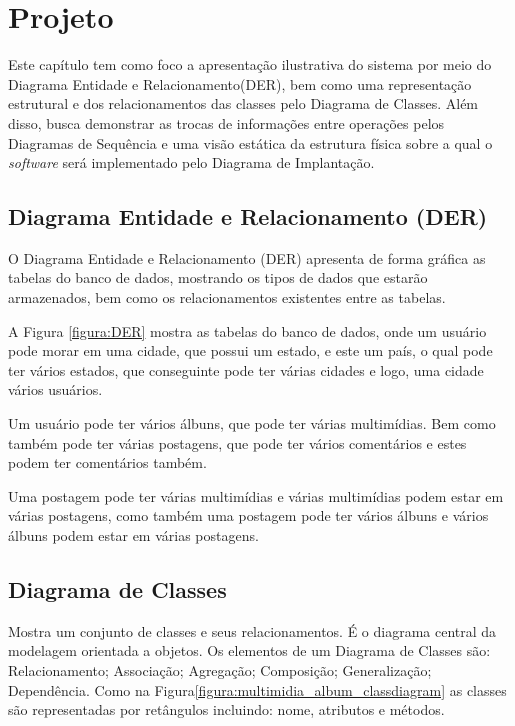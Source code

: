 \chapter{Projeto}

Este capítulo tem como foco a apresentação ilustrativa do sistema por meio do Diagrama Entidade e Relacionamento(DER), bem como uma representação estrutural e dos relacionamentos das classes pelo Diagrama de Classes. Além disso, busca demonstrar as trocas de informações entre operações pelos Diagramas de Sequência e uma visão estática da estrutura física sobre a qual o \textit{software} será implementado pelo Diagrama de Implantação.

\section{Diagrama Entidade e Relacionamento (DER)}

O Diagrama Entidade e Relacionamento (DER) apresenta de forma gráfica as tabelas do banco de dados, mostrando os tipos de dados que estarão armazenados, bem como os relacionamentos existentes entre as tabelas.

A Figura \ref{figura:DER} mostra as tabelas do banco de dados, onde um usuário pode morar em uma cidade, que possui um estado, e este um país, o qual pode ter vários estados, que conseguinte pode ter várias cidades e logo, uma cidade vários usuários.

Um usuário pode ter vários álbuns, que pode ter várias multimídias. Bem como também pode ter várias postagens, que pode ter vários comentários e estes podem ter comentários também.

Uma postagem pode ter várias multimídias e várias multimídias podem estar em várias postagens, como também uma postagem pode ter vários álbuns e vários álbuns podem estar em várias postagens.


\newpage

\section{Diagrama de Classes}

Mostra um conjunto de classes e seus relacionamentos. É o diagrama central da modelagem orientada a objetos. Os elementos de um Diagrama de Classes são:
Relacionamento; Associação; Agregação; Composição; Generalização; Dependência. Como na Figura\ref{figura:multimidia_album_classdiagram} as classes são representadas por retângulos incluindo: nome, atributos e métodos.

